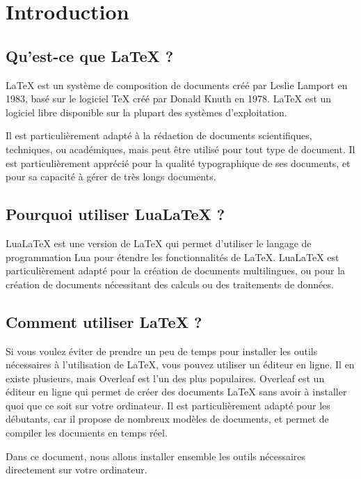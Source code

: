 \documentclass[./main.tex]{subfiles}
\begin{document}
\chapter{Introduction}

\section{Qu'est-ce que \LaTeX{} ?}

\LaTeX{} est un système de composition de documents créé par Leslie Lamport en 1983, basé sur le logiciel TeX créé par Donald Knuth en 1978. \LaTeX{} est un logiciel libre disponible sur la plupart des systèmes d'exploitation.

Il est particulièrement adapté à la rédaction de documents scientifiques, techniques, ou académiques, mais peut être utilisé pour tout type de document. Il est particulièrement apprécié pour la qualité typographique de ses documents, et pour sa capacité à gérer de très longs documents.

\section{Pourquoi utiliser Lua\LaTeX{} ?}

Lua\LaTeX{} est une version de \LaTeX{} qui permet d'utiliser le langage de programmation Lua pour étendre les fonctionnalités de \LaTeX{}. Lua\LaTeX{} est particulièrement adapté pour la création de documents multilingues, ou pour la création de documents nécessitant des calculs ou des traitements de données.

\section{Comment utiliser \LaTeX{} ?}

Si vous voulez éviter de prendre un peu de temps pour installer les outils nécessaires à l'utilisation de \LaTeX{}, vous pouvez utiliser un éditeur en ligne. Il en existe plusieurs, mais Overleaf est l'un des plus populaires. Overleaf est un éditeur en ligne qui permet de créer des documents \LaTeX{} sans avoir à installer quoi que ce soit sur votre ordinateur. Il est particulièrement adapté pour les débutants, car il propose de nombreux modèles de documents, et permet de compiler les documents en temps réel.

Dans ce document, nous allons installer ensemble les outils nécessaires directement sur votre ordinateur.
\end{document}
